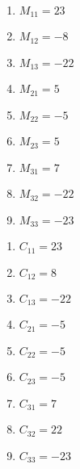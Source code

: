 \documentclass[12pt]{article}
\begin{document}
\begin{enumerate}
    \begin{multicols}{2}

      \begin{enumerate}

        \item $M_{11}=23$

        \item $M_{12}=-8$

        \item $M_{13}=-22$

        \item $M_{21}=5$

        \item $M_{22}=-5$

        \item $M_{23}=5$

        \item $M_{31}=7$

        \item $M_{32}=-22$

        \item $M_{33}=-23$

      \end{enumerate}

      \begin{enumerate}

        \item $C_{11}=23$

        \item $C_{12}=8$

        \item $C_{13}=-22$

        \item $C_{21}=-5$

        \item $C_{22}=-5$

        \item $C_{23}=-5$

        \item $C_{31}=7$

        \item $C_{32}=22$

        \item $C_{33}=-23$

      \end{enumerate}

    \end{multicols}

    \setcounter{enumi}{16}


\end{enumerate}
\end{document}
